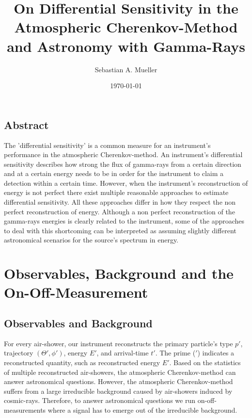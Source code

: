 \documentclass{article}%
\title{
    On Differential Sensitivity in the Atmospheric Cherenkov-Method and Astronomy with Gamma-Rays
}%
\author{Sebastian A. Mueller}%
\date{\today{}}%
\begin{document}
%
    \maketitle%
    \newcommand{\dd}[2]{\frac{\mathrm{d}#1}{\mathrm{d}#2}}
    \subsection*{Abstract}
        The 'differential sensitivity' is a common measure for an instrument's performance in the atmospheric Cherenkov-method.
        An instrument's differential sensitivity describes how strong the flux of gamma-rays from a certain direction and at a certain energy needs to be in order for the instrument to claim a detection within a certain time.
        However, when the instrument's reconstruction of energy is not perfect there exist multiple reasonable approaches to estimate differential sensitivity.
        All these approaches differ in how they respect the non perfect reconstruction of energy.
        Although a non perfect reconstruction of the gamma-rays energies is clearly related to the instrument, some of the approaches to deal with this shortcoming can be interpreted as assuming slightly different astronomical scenarios for the source's spectrum in energy.
    \section{Observables, Background and the On-Off-Measurement}
        \label{SecObservablesAndOnOff}
        \subsection*{Observables and Background}
            For every air-shower, our instrument reconstructs the primary particle's type $p'$, trajectory $(\Theta', \phi')$, energy $E'$, and arrival-time $t'$.
            The prime ($'$) indicates a reconstructed quantity, such as reconstructed energy $E'$.
            Based on the statistics of multiple reconstructed air-showers, the atmospheric Cherenkov-method can answer astronomical questions.
            However, the atmospheric Cherenkov-method suffers from a large irreducible background caused by air-showers induced by cosmic-rays.
            Therefore, to answer astronomical questions we run on-off-measurements where a signal has to emerge out of the irreducible background.
\end{document}
